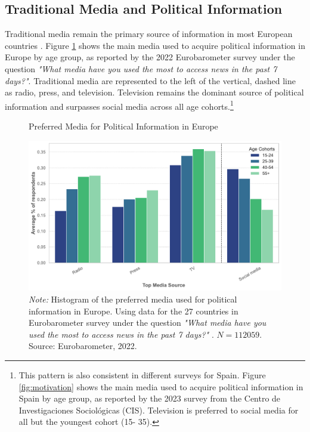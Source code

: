 \documentclass[12pt]{article}
\begin{document}
	\label{sec:context}
	
		\subsection{Traditional Media and Political Information}
	
	Traditional media remain the primary source of information in most European countries \citep{europarl2024}. Figure \ref{fig:motivation2} shows the main media used to acquire political information in Europe by age group, as reported by the 2022 Eurobarometer survey under the question \textit{"What media have you used the most to access news in the past 7 days?"}. Traditional media are represented to the left of the vertical, dashed line as radio, press, and television. Television remains the dominant source of political information and  surpasses social media across all age cohorts.\footnote{This pattern is also consistent in different surveys for Spain. Figure \ref{fig:motivation} shows the main media used to acquire political information in Spain by age group, as reported by the 2023 survey from the Centro de Investigaciones Sociológicas (CIS). Television is preferred to social media for all but the youngest cohort (15- 35). 
	}
	
	
	
	\begin{figure}[!htb]
		\centering
		\caption{Preferred Media for Political Information in Europe}
		\includegraphics[width=130mm]{figures/age_cohorts_full}
		\caption*{\small \textit{Note:} Histogram of the preferred media used for political information in Europe. Using data for the 27 countries in Eurobarometer survey under the question \textit{"What media have you used the most to access news in the past 7 days?" }. $N=112059.$ 
			Source: Eurobarometer, 2022. }
		\label{fig:motivation2}
	\end{figure}
	
\end{document}
